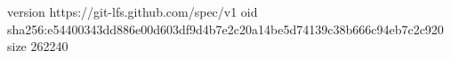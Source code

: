 version https://git-lfs.github.com/spec/v1
oid sha256:e54400343dd886e00d603df9d4b7e2c20a14be5d74139c38b666c94eb7c2c920
size 262240
